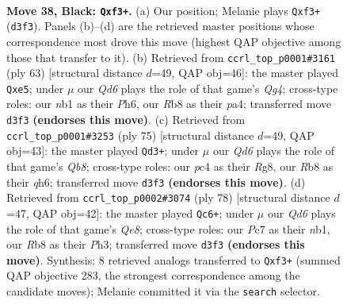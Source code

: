 \documentclass[11pt]{article}
\begin{document}
\clearpage

\begin{figure}[p]\centering
\begin{subfigure}{0.46\textwidth}\centering
\resizebox{\linewidth}{!}{%
\newchessgame
\chessboard[
  setfen={1r4k1/2p2p2/8/2Q5/2P1P1P1/3q1R1K/8/1N6 b - - 0 38},
  showmover=false,
  pgfstyle=straightmove, color=movearrow, markmove={d3-f3}
]}
\caption{}
\end{subfigure}\hfill
\begin{subfigure}{0.46\textwidth}\centering
\resizebox{\linewidth}{!}{%
\newchessgame
\chessboard[
  setfen={7k/p7/7p/2p1R1q1/P4r2/1Q6/1P4NP/6K1 b - - 0 32},
  showmover=false,
  pgfstyle=straightmove, color=movearrow, markmove={g5-e5}
]}
\caption{}
\end{subfigure}
\\[4pt]
\begin{subfigure}{0.46\textwidth}\centering
\resizebox{\linewidth}{!}{%
\newchessgame
\chessboard[
  setfen={6r1/4pk2/7Q/1Np5/2P5/7P/5P2/1q2RK2 b - - 7 38},
  showmover=false,
  pgfstyle=straightmove, color=movearrow, markmove={b1-d3}
]}
\caption{}
\end{subfigure}\hfill
\begin{subfigure}{0.46\textwidth}\centering
\resizebox{\linewidth}{!}{%
\newchessgame
\chessboard[
  setfen={kr2Q3/p7/6N1/3pp3/8/7P/P4qP1/1n5K w - - 3 40},
  showmover=false,
  pgfstyle=straightmove, color=movearrow, markmove={e8-c6}
]}
\caption{}
\end{subfigure}
\caption{\textbf{Move 38, Black: \texttt{Qxf3+}.} (a) Our position; Melanie plays \texttt{Qxf3+} (\texttt{d3f3}). Panels (b)--(d) are the retrieved master positions whose correspondence most drove this move (highest QAP objective among those that transfer to it). (b) Retrieved from \texttt{ccrl\_top\_p0001\#3161} (ply 63) [structural distance $d$=49, QAP obj=46]: the master played \texttt{Qxe5}; under $\mu$ our \emph{Qd6} plays the role of that game's \emph{Qg4}; cross-type roles: our \emph{n}b1 as their \emph{P}h6, our \emph{R}b8 as their \emph{p}a4; transferred move \texttt{d3f3} \textbf{(endorses this move)}. (c) Retrieved from \texttt{ccrl\_top\_p0001\#3253} (ply 75) [structural distance $d$=49, QAP obj=43]: the master played \texttt{Qd3+}; under $\mu$ our \emph{Qd6} plays the role of that game's \emph{Qb8}; cross-type roles: our \emph{p}c4 as their \emph{R}g8, our \emph{R}b8 as their \emph{q}h6; transferred move \texttt{d3f3} \textbf{(endorses this move)}. (d) Retrieved from \texttt{ccrl\_top\_p0002\#3074} (ply 78) [structural distance $d$=47, QAP obj=42]: the master played \texttt{Qc6+}; under $\mu$ our \emph{Qd6} plays the role of that game's \emph{Qe8}; cross-type roles: our \emph{P}c7 as their \emph{n}b1, our \emph{R}b8 as their \emph{P}h3; transferred move \texttt{d3f3} \textbf{(endorses this move)}. Synthesis: 8 retrieved analogs transferred to \texttt{Qxf3+} (summed QAP objective 283, the strongest correspondence among the candidate moves); Melanie committed it via the \texttt{search} selector.}
\label{fig:thought-m75}
\end{figure}
\end{document}
